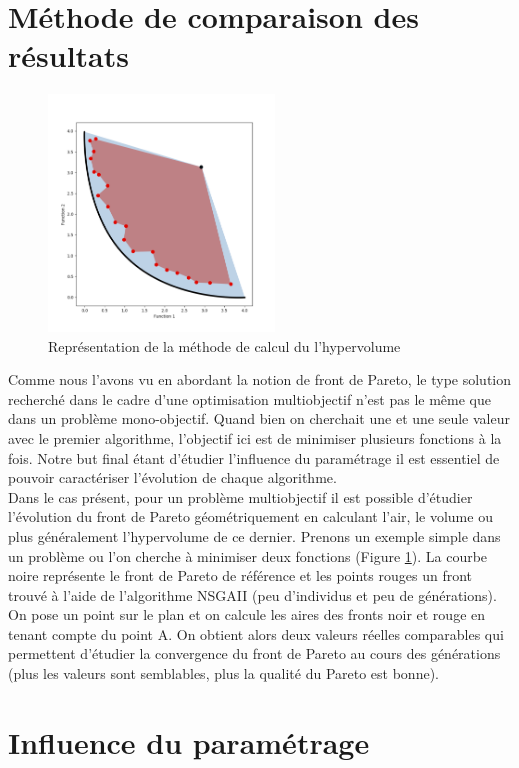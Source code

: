 \documentclass[12pt]{report}
\begin{document}
    \section{Méthode de comparaison des résultats}
      \begin{figure}
        \centering
        \includegraphics[width=6cm]{img/hypervolume.png}
        \caption{Représentation de la méthode de calcul du l'hypervolume}
        \label{hypervolume}
      \end{figure}
      Comme nous l'avons vu en abordant la notion de front de Pareto, le type solution recherché dans le cadre d'une optimisation multiobjectif n'est pas le même que dans un problème mono-objectif. Quand bien on cherchait une et une seule valeur avec le premier algorithme, l'objectif ici est de minimiser plusieurs fonctions à la fois. Notre but final étant d'étudier l'influence du paramétrage il est essentiel de pouvoir caractériser l'évolution de chaque algorithme. \\
      Dans le cas présent, pour un problème multiobjectif il est possible d'étudier l'évolution du front de Pareto géométriquement en calculant l'air, le volume ou plus généralement l'hypervolume de ce dernier.
      Prenons un exemple simple dans un problème ou l'on cherche à minimiser deux fonctions (Figure \ref{hypervolume}). La courbe noire représente le front de Pareto de référence et les points rouges un front trouvé à l'aide de l'algorithme NSGAII (peu d'individus et peu de générations). On pose un point sur le plan et on calcule les aires des fronts noir et rouge en tenant compte du point A. On obtient alors deux valeurs réelles comparables qui permettent d'étudier la convergence du front de Pareto au cours des générations (plus les valeurs sont semblables, plus la qualité du Pareto est bonne).
    \section{Influence du paramétrage}
\end{document}
